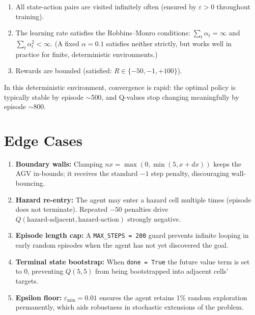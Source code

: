 \documentclass[12pt]{article}
\begin{document}
\begin{enumerate}
    \item All state-action pairs are visited infinitely often (ensured by
          $\varepsilon > 0$ throughout training).
    \item The learning rate satisfies the Robbins--Monro conditions:
          $\sum_t \alpha_t = \infty$ and $\sum_t \alpha_t^2 < \infty$.
          (A fixed $\alpha = 0.1$ satisfies neither strictly, but works well
          in practice for finite, deterministic environments.)
    \item Rewards are bounded (satisfied: $R \in \{-50, -1, +100\}$).
\end{enumerate}

In this deterministic environment, convergence is rapid: the optimal policy
is typically stable by episode $\sim$500, and Q-values stop changing
meaningfully by episode $\sim$800.

\section{Edge Cases}

\begin{enumerate}
    \item \textbf{Boundary walls:} Clamping $nx = \max(0, \min(5, x+dx))$
          keeps the AGV in-bounds; it receives the standard $-1$ step penalty,
          discouraging wall-bouncing.
    \item \textbf{Hazard re-entry:} The agent may enter a hazard cell multiple
          times (episode does not terminate). Repeated $-50$ penalties drive
          $Q(\text{hazard-adjacent}, \text{hazard-action})$ strongly negative.
    \item \textbf{Episode length cap:} A \texttt{MAX\_STEPS = 200} guard
          prevents infinite looping in early random episodes when the agent
          has not yet discovered the goal.
    \item \textbf{Terminal state bootstrap:} When \texttt{done = True} the
          future value term is set to 0, preventing $Q(5,5)$ from being
          bootstrapped into adjacent cells' targets.
    \item \textbf{Epsilon floor:} $\varepsilon_{\min} = 0.01$ ensures the agent
          retains 1\% random exploration permanently, which aids robustness
          in stochastic extensions of the problem.
\end{enumerate}
\end{document}
